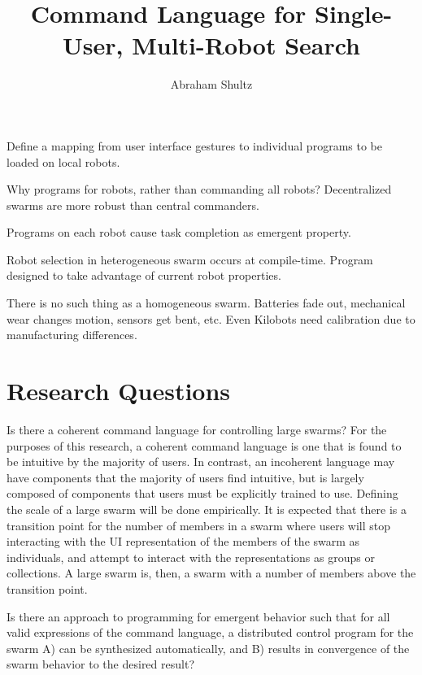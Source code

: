 \documentclass[]{article}
\title{Command Language for Single-User, Multi-Robot Search}
\author{Abraham Shultz}
\begin{document}
\maketitle

\begin{abstract}

\end{abstract}


Define a mapping from user interface gestures to individual programs to be loaded on local robots.

Why programs for robots, rather than commanding all robots?
Decentralized swarms are more robust than central commanders.

Programs on each robot cause task completion as emergent property.

Robot selection in heterogeneous swarm occurs at compile-time.
Program designed to take advantage of current robot properties.

There is no such thing as a homogeneous swarm.
Batteries fade out, mechanical wear changes motion, sensors get bent, etc.
Even Kilobots need calibration due to manufacturing differences.

\section{Research Questions}

Is there a coherent command language for controlling large swarms?  
For the purposes of this research, a coherent command language is one that is found to be intuitive by the majority of users. 
In contrast, an incoherent language may have components that the majority of users find intuitive, but is largely composed of components that users must be explicitly trained to use. 
Defining the scale of a large swarm will be done empirically.
It is expected that there is a transition point for the number of members in a swarm where users will stop interacting with the UI representation of the members of the swarm as individuals, and attempt to interact with the representations as groups or collections. 
A large swarm is, then, a swarm with a number of members above the transition point. 

Is there an approach to programming for emergent behavior such that for all valid expressions of the command language, a distributed control program for the swarm A) can be synthesized automatically, and B) results in convergence of the swarm behavior to the desired result? 
\end{document}
